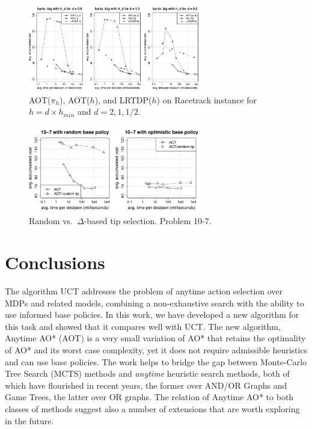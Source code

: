 \documentclass[letterpaper]{article}
\begin{document}
\begin{figure}
\centering
\includegraphics[width=3in,clip=on,trim=.75cm 1cm 1.5cm 1cm]{barto-big-aot-vs-lrtdp-minmin.pdf}
\caption{AOT($\pi_h$), AOT($h$), and LRTDP($h$) on
   Racetrack instance for $h=d \times h_{min}$ and $d=2,1,1/2$.}
\label{fig:aot_vs_lrtdp:racetrack}
\end{figure}

\begin{figure}
\centering
\includegraphics[width=3in,clip=on,trim=.75cm 1cm 1.5cm 1cm]{ctp_selection_10-7.pdf}
\caption{Random vs.\ $\Delta$-based tip selection. Problem 10-7.}
\label{fig:ctp:selection:10-7}
\end{figure}




\section{Conclusions}

The algorithm UCT addresses the problem of anytime action selection over MDPs and related models,
combining a  non-exhaustive search with the ability to  use informed base policies.
In this work, we  have developed a new  algorithm for this task and showed that it compares well with UCT. The new algorithm, Anytime AO* (AOT)
is a very small variation of AO* that retains the optimality of AO* and its worst case  complexity,
yet it does not require  admissible heuristics and can use base policies. The work
 helps to  bridge the gap between  Monte-Carlo Tree Search (MCTS) methods and \emph{anytime} heuristic search methods,
both of which have flourished in recent years, the former over AND/OR Graphs and Game Trees, the latter
over OR graphs. The relation of Anytime AO* to both classes of methods  suggest also
a number of extensions that are worth exploring in the future.
\end{document}
